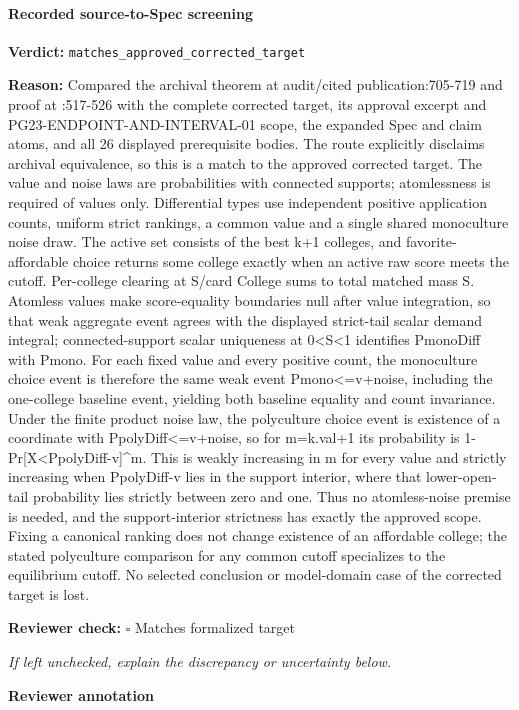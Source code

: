 \documentclass[10pt]{article}
\newcommand{\reviewerbox}{%
  \par\noindent\fbox{\parbox{0.96\linewidth}{\rule{0pt}{0.38in}}}\par
}
\newcommand{\reviewmatch}[1]{%
  \par\noindent\textbf{Reviewer check:} $\square$\; #1\par
  \noindent\emph{If left unchecked, explain the discrepancy or uncertainty below.}\par
}
\begin{document}
\paragraph{Recorded source-to-Spec screening}
\textbf{Verdict:} \texttt{matches\_approved\_corrected\_target}
\\
{\raggedright
\textbf{Reason:} Compared the archival theorem at audit/\allowbreak{}cited publication:\allowbreak{}705-\allowbreak{}719 and proof at :\allowbreak{}517-\allowbreak{}526 with the complete corrected target, its approval excerpt and PG23-\allowbreak{}ENDPOINT-\allowbreak{}AND-\allowbreak{}INTERVAL-\allowbreak{}01 scope, the expanded Spec and claim atoms, and all 26 displayed prerequisite bodies.\allowbreak{} The route explicitly disclaims archival equivalence, so this is a match to the approved corrected target.\allowbreak{} The value and noise laws are probabilities with connected supports;\allowbreak{} atomlessness is required of values only.\allowbreak{} Differential types use independent positive application counts, uniform strict rankings, a common value and a single shared monoculture noise draw.\allowbreak{} The active set consists of the best k+1 colleges, and favorite-\allowbreak{}affordable choice returns some college exactly when an active raw score meets the cutoff.\allowbreak{} Per-\allowbreak{}college clearing at S/\allowbreak{}card College sums to total matched mass S.\allowbreak{} Atomless values make score-\allowbreak{}equality boundaries null after value integration, so that weak aggregate event agrees with the displayed strict-\allowbreak{}tail scalar demand integral;\allowbreak{} connected-\allowbreak{}support scalar uniqueness at 0<S<1 identifies PmonoDiff with Pmono.\allowbreak{} For each fixed value and every positive count, the monoculture choice event is therefore the same weak event Pmono<=v+noise, including the one-\allowbreak{}college baseline event, yielding both baseline equality and count invariance.\allowbreak{} Under the finite product noise law, the polyculture choice event is existence of a coordinate with PpolyDiff<=v+noise, so for m=k.\allowbreak{}val+1 its probability is 1-\allowbreak{}Pr[X<PpolyDiff-\allowbreak{}v]\textasciicircum{}m.\allowbreak{} This is weakly increasing in m for every value and strictly increasing when PpolyDiff-\allowbreak{}v lies in the support interior, where that lower-\allowbreak{}open-\allowbreak{}tail probability lies strictly between zero and one.\allowbreak{} Thus no atomless-\allowbreak{}noise premise is needed, and the support-\allowbreak{}interior strictness has exactly the approved scope.\allowbreak{} Fixing a canonical ranking does not change existence of an affordable college;\allowbreak{} the stated polyculture comparison for any common cutoff specializes to the equilibrium cutoff.\allowbreak{} No selected conclusion or model-\allowbreak{}domain case of the corrected target is lost.\allowbreak{}
\par}
\reviewmatch{Matches formalized target}
\noindent\textbf{Reviewer annotation}\par
\reviewerbox
\clearpage
\hypertarget{source-claim-e7728bad4731a7d0}{}
\end{document}
